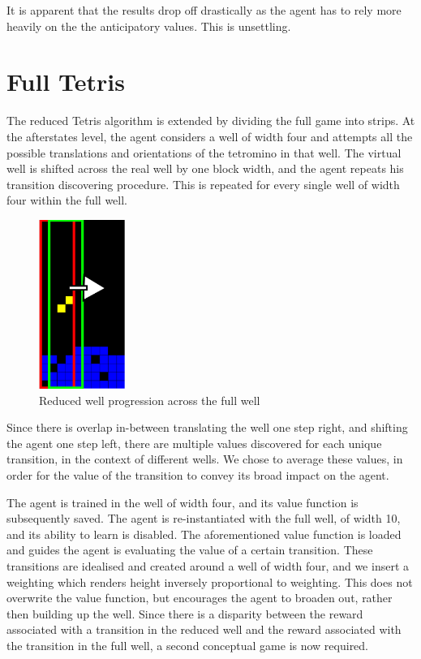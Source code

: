 \documentclass[a4paper,twocolumn]{article}
\begin{document}
It is apparent that the results drop off drastically as the agent has to rely more heavily on the the anticipatory values. This is unsettling.

\section{Full Tetris}

The reduced Tetris algorithm is extended by dividing the full game into strips. At the afterstates level, the agent considers a well of width four and attempts all the possible translations and orientations of the tetromino in that well. The virtual well is shifted across the real well by one block width, and the agent repeats his transition discovering procedure. This is repeated for every single well of width four within the full well.

\begin{figure}[h]
\centering
\includegraphics[width=1.1in]{decomposedwell.png}
\caption{Reduced well progression across the full well }
\label{fig:6width}
\end{figure}

Since there is overlap in-between translating the well one step right, and shifting the agent one step left, there are multiple values discovered for each unique transition, in the context of different wells. We chose to average these values, in order for the value of the transition to convey its broad impact on the agent.

The agent is trained in the well of width four, and its value function is subsequently saved. The agent is re-instantiated with the full well, of width 10, and its ability to learn is disabled. The aforementioned value function is loaded and guides the agent is evaluating the value of a certain transition. These transitions are idealised and created around a well of width four, and we insert a weighting which renders height inversely proportional to weighting. This does not overwrite the value function, but encourages the agent to broaden out, rather then building up the well. Since there is a disparity between the reward associated with a transition in the reduced well and the reward associated with the transition in the full well, a second conceptual game is now required.
\end{document}
